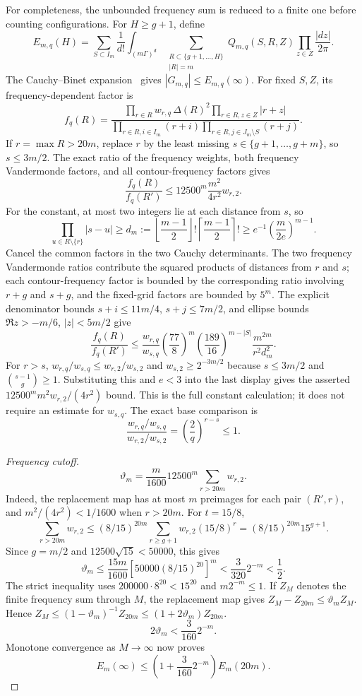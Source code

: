 For completeness, the unbounded frequency sum is reduced to a finite one
before counting configurations.  For $H\ge g+1$, define
\[
 E_{m,q}(H)=\sum_{S\subset I_m}\frac1{d!}
 \int_{(m\Gamma)^d}
 \sum_{\substack{R\subset\{g+1,\ldots,H\}\\|R|=m}}
 Q_{m,q}(S,R,Z)\prod_{z\in Z}\frac{|dz|}{2\pi}.
\]
The Cauchy--Binet expansion~\cite{Gantmacher} gives
$|G_{m,q}|\le E_{m,q}(\infty)$.
For fixed $S,Z$, its frequency-dependent
factor is
\[
 f_q(R)=
 \frac{\prod_{r\in R}w_{r,q}\,\Delta(R)^2
       \prod_{r\in R,z\in Z}|r+z|}
      {\prod_{r\in R,i\in I_m}(r+i)
       \prod_{r\in R,j\in J_m\setminus S}(r+j)}.
\]
If $r=\max R>20m$, replace $r$ by the least missing
$s\in\{g+1,\ldots,g+m\}$, so $s\le3m/2$.  The exact ratio of
the frequency weights, both frequency Vandermonde factors, and all
contour-frequency factors gives
\[
\frac{f_q(R)}{f_q(R')}\le
      12500^m\frac{m^2}{4r^2}w_{r,2}.
\]
For the constant, at most two integers lie at each distance from $s$, so
\[
 \prod_{u\in R\setminus\{r\}}|s-u|
 \ge d_m:=
 \left\lfloor\frac{m-1}{2}\right\rfloor!
 \left\lceil\frac{m-1}{2}\right\rceil!
 \ge e^{-1}\left(\frac{m}{2e}\right)^{m-1}.
\]
Cancel the common factors in the two Cauchy determinants.  The two
frequency Vandermonde ratios contribute the squared products of distances
from $r$ and $s$; each contour-frequency factor is bounded by the
corresponding ratio involving $r+g$ and $s+g$, and the fixed-grid factors
are bounded by $5^m$.  The explicit denominator bounds
$s+i\le11m/4$, $s+j\le7m/2$, and ellipse bounds
$\Re z>-m/6$, $|z|<5m/2$ give
\[
 \frac{f_q(R)}{f_q(R')}
 \le \frac{w_{r,q}}{w_{s,q}}
       \left(\frac{77}{8}\right)^m
       \left(\frac{189}{16}\right)^{m-|S|}
       \frac{m^{2m}}{r^2d_m^2}.
\]
For $r>s$, $w_{r,q}/w_{s,q}\le w_{r,2}/w_{s,2}$ and
$w_{s,2}\ge2^{-3m/2}$ because $s\le3m/2$ and
$\binom{s-1}{g}\ge1$.  Substituting this and $e<3$ into the last
display gives the asserted $12500^m m^2w_{r,2}/(4r^2)$ bound.  This is the
full constant calculation; it does not require an estimate for $w_{s,q}$.
The exact base comparison is
\[
 \frac{w_{r,q}/w_{s,q}}{w_{r,2}/w_{s,2}}
       =\left(\frac2q\right)^{r-s}\le1.
\]
\begin{proof}[Frequency cutoff]\label{eq:p0-frequency-cutoff}
\[
 \vartheta_m=\frac{m}{1600}12500^m\sum_{r>20m}w_{r,2}.
\]
Indeed, the replacement map has at most $m$ preimages for each pair
$(R',r)$, and $m^2/(4r^2)<1/1600$ when $r>20m$.  For $t=15/8$,
\[
 \sum_{r>20m}w_{r,2}
 \le(8/15)^{20m}\sum_{r\ge g+1}w_{r,2}(15/8)^r
 =(8/15)^{20m}15^{g+1}.
\]
Since $g=m/2$ and
$12500\sqrt{15}<50000$, this gives
\[
 \vartheta_m\le\frac{15m}{1600}
       \left[50000(8/15)^{20}\right]^m
 <\frac3{320}2^{-m}<\frac12.
\]
The strict inequality uses $200000\cdot8^{20}<15^{20}$ and
$m2^{-m}\le1$.  If $Z_M$ denotes the finite frequency sum through $M$,
the replacement map gives $Z_M-Z_{20m}\le \vartheta_mZ_M$.  Hence
$Z_M\le(1-\vartheta_m)^{-1}Z_{20m}\le(1+2\vartheta_m)Z_{20m}$.
\[
 2\vartheta_m<\frac3{160}2^{-m}.
\]
Monotone convergence as $M\to\infty$ now proves
\[
 E_m(\infty)\le\left(1+\frac3{160}2^{-m}\right)E_m(20m).
\]
\end{proof}
